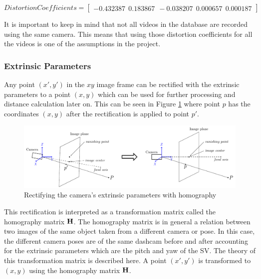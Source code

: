 \begin{equation}
    DistortionCoefficients = 
    \begin{bmatrix}
    -0.432387 ~~ 0.183867 ~~ -0.038207 ~~ 0.000657 ~~ 0.000187 
    \end{bmatrix}
\end{equation}

It is important to keep in mind that not all videos in the database are recorded using the same camera. This means that using those distortion coefficients for all the videos is one of the assumptions in the project.


\subsubsection{Extrinsic Parameters}
\label{sec:meth_ExtrensicParameters}

Any point $(x',y')$ in the $xy$ image frame can be rectified with the extrinsic parameters to a point $(x,y)$ which can be used for further processing and distance calculation later on. This can be seen in Figure \ref{fig:homo_rect} where point $p$ has the coordinates $(x,y)$ after the rectification is applied to point $p'$. 
\begin{figure}[H]
    \centering
    \includegraphics[width = \textwidth]{Figures/homo_rectify.pdf}
    \caption{Rectifying the camera's extrinsic parameters with homography}
    \label{fig:homo_rect}
\end{figure}

This rectification is interpreted as a transformation matrix called the homography matrix $\bf{H}$. The homography matrix is in general a relation between two images of the same object taken from a different camera or pose. In this case, the different camera poses are of the same dashcam before and after accounting for the extrinsic parameters which are the pitch and yaw of the SV. The theory of this transformation matrix is described here. A point $(x',y')$ is transformed to $(x,y)$ using the homography matrix $\bf{H}$.

